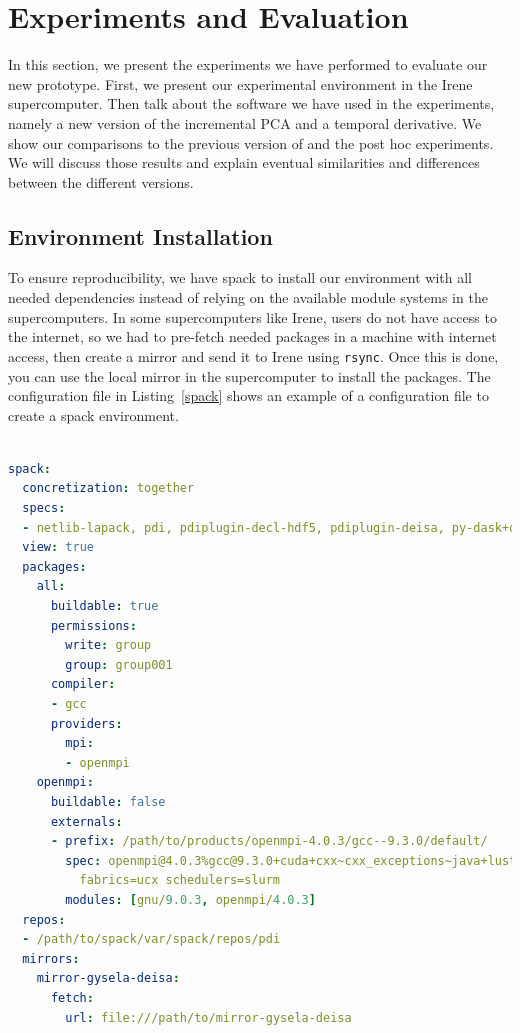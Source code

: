 \section{Experiments and Evaluation}
In this section, we present the experiments we have performed to evaluate our new prototype. First, we present our experimental environment in the Irene supercomputer. Then talk about the software we have used in the experiments, namely a new version of the incremental PCA and a temporal derivative. We show our comparisons to the previous version of \deisa and the post hoc experiments. We will discuss those results and explain eventual similarities and differences between the different versions.  

\subsection{Environment Installation}
To ensure reproducibility, we have spack to install our environment with all needed dependencies instead of relying on the available module systems in the supercomputers. 
In some supercomputers like Irene, users do not have access to the internet, so we had to pre-fetch needed packages in a machine with internet access, then create a mirror and send it to Irene using \texttt{rsync}. Once this is done, you can use the local mirror in the supercomputer to install the packages. The configuration file in Listing~\ref{spack} shows an example of a configuration file to create a spack environment.     

\begin{lstlisting}[float, label=spack, language=yaml, caption=Spack environment installation configuration file]

spack:
  concretization: together
  specs:
  - netlib-lapack, pdi, pdiplugin-decl-hdf5, pdiplugin-deisa, py-dask+diagnostics py-h5py, pdiplugin-mpi, pdiplugin-pycall
  view: true
  packages:
    all:
      buildable: true
      permissions:
        write: group
        group: group001
      compiler:
      - gcc
      providers:
        mpi:
        - openmpi
    openmpi:
      buildable: false
      externals:
      - prefix: /path/to/products/openmpi-4.0.3/gcc--9.3.0/default/
        spec: openmpi@4.0.3%gcc@9.3.0+cuda+cxx~cxx_exceptions~java+lustre~memchecker+pmi+pmix~sqlite3~static~thread_multiple~wrapper-rpath
          fabrics=ucx schedulers=slurm
        modules: [gnu/9.0.3, openmpi/4.0.3]
  repos:
  - /path/to/spack/var/spack/repos/pdi
  mirrors:
    mirror-gysela-deisa:
      fetch:
        url: file:///path/to/mirror-gysela-deisa

\end{lstlisting}


